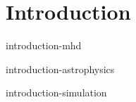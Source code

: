 \chapter{Introduction}
\setcounter{page}{1}

 {introduction-mhd}

 {introduction-astrophysics}

 {introduction-simulation}